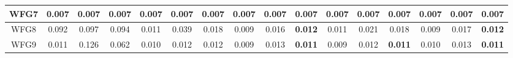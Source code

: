 \begin{table}[]
{\begin{tabular}{c|c|c|c|c|c|c|c|c|c|c|c|c|c|c|c|}
\multicolumn{1}{|c|}{WFG7} & 0.007 & 0.007 & \textbf{0.007} & 0.007 & 0.007 & \textbf{0.007} & 0.007 & 0.007 & \textbf{0.007} & 0.007 & 0.007 & \textbf{0.007} & 0.007 & 0.007 & \textbf{0.007} \\ \hline
\multicolumn{1}{|c|}{WFG8} & 0.092 & 0.097 & 0.094 & 0.011 & 0.039 & 0.018 & 0.009 & 0.016 & \textbf{0.012} & 0.011 & 0.021 & 0.018 & 0.009 & 0.017 & \textbf{0.012} \\ \hline
\multicolumn{1}{|c|}{WFG9} & 0.011 & 0.126 & 0.062 & 0.010 & 0.012 & 0.012 & 0.009 & 0.013 & \textbf{0.011} & 0.009 & 0.012 & \textbf{0.011} & 0.010 & 0.013 & \textbf{0.011} \\ \hline
\end{tabular}%
}
\end{table}


